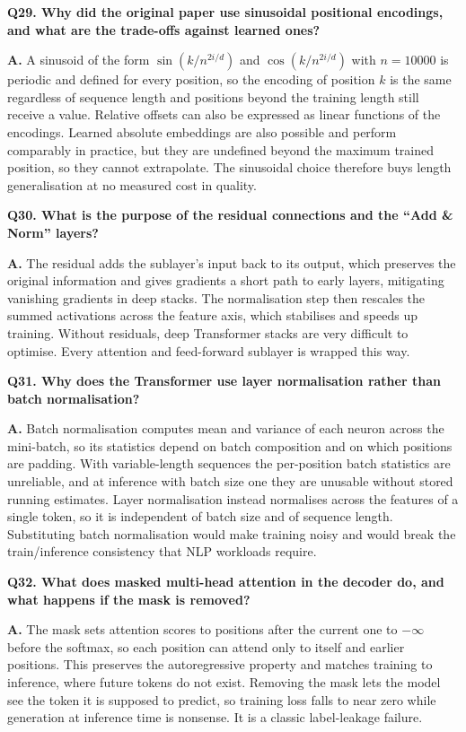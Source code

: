 \documentclass[11pt]{article}
\begin{document}
\medskip
\noindent\textbf{Q29. Why did the original paper use sinusoidal positional encodings, and what are the trade-offs against learned ones?}

\noindent\textbf{A.} A sinusoid of the form $\sin(k/n^{2i/d})$ and $\cos(k/n^{2i/d})$ with $n=10000$ is periodic and defined for every position, so the encoding of position $k$ is the same regardless of sequence length and positions beyond the training length still receive a value. Relative offsets can also be expressed as linear functions of the encodings. Learned absolute embeddings are also possible and perform comparably in practice, but they are undefined beyond the maximum trained position, so they cannot extrapolate. The sinusoidal choice therefore buys length generalisation at no measured cost in quality.

\medskip
\noindent\textbf{Q30. What is the purpose of the residual connections and the ``Add \& Norm'' layers?}

\noindent\textbf{A.} The residual adds the sublayer's input back to its output, which preserves the original information and gives gradients a short path to early layers, mitigating vanishing gradients in deep stacks. The normalisation step then rescales the summed activations across the feature axis, which stabilises and speeds up training. Without residuals, deep Transformer stacks are very difficult to optimise. Every attention and feed-forward sublayer is wrapped this way.

\medskip
\noindent\textbf{Q31. Why does the Transformer use layer normalisation rather than batch normalisation?}

\noindent\textbf{A.} Batch normalisation computes mean and variance of each neuron across the mini-batch, so its statistics depend on batch composition and on which positions are padding. With variable-length sequences the per-position batch statistics are unreliable, and at inference with batch size one they are unusable without stored running estimates. Layer normalisation instead normalises across the features of a single token, so it is independent of batch size and of sequence length. Substituting batch normalisation would make training noisy and would break the train/inference consistency that NLP workloads require.

\medskip
\noindent\textbf{Q32. What does masked multi-head attention in the decoder do, and what happens if the mask is removed?}

\noindent\textbf{A.} The mask sets attention scores to positions after the current one to $-\infty$ before the softmax, so each position can attend only to itself and earlier positions. This preserves the autoregressive property and matches training to inference, where future tokens do not exist. Removing the mask lets the model see the token it is supposed to predict, so training loss falls to near zero while generation at inference time is nonsense. It is a classic label-leakage failure.
\end{document}
